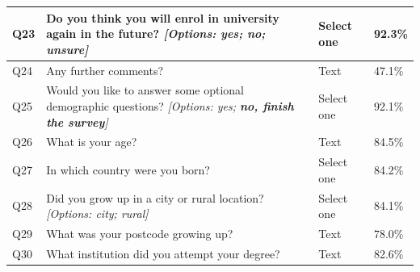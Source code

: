 \begin{longtable}{p{.7cm}p{18.6cm}p{2cm}p{2cm}}
        \midrule
        Q23   & Do you think you will enrol in university again in the future? \newline \textit{[Options: yes; no; unsure]} & Select one & 92.3\% \\
        \midrule
        Q24   & Any further comments? & Text  & 47.1\% \\
        \midrule
        Q25   & Would you like to answer some optional demographic questions? \newline \textit{[Options: yes; \textbf{no, finish the survey}]} & Select one & 92.1\% \\
        \midrule
        Q26   & What is your age? & Text  & 84.5\% \\
        \midrule
        Q27   & In which country were you born? & Select one & 84.2\% \\
        \midrule
        Q28   & Did you grow up in a city or rural location? \newline \textit{[Options: city; rural]} & Select one & 84.1\% \\
        \midrule
        Q29   & What was your postcode growing up? & Text  & 78.0\% \\
        \midrule
        Q30   & What institution did you attempt your degree? & Text  & 82.6\% \\
        \bottomrule
        
    \end{longtable}
    \egroup
    \twocolumn
